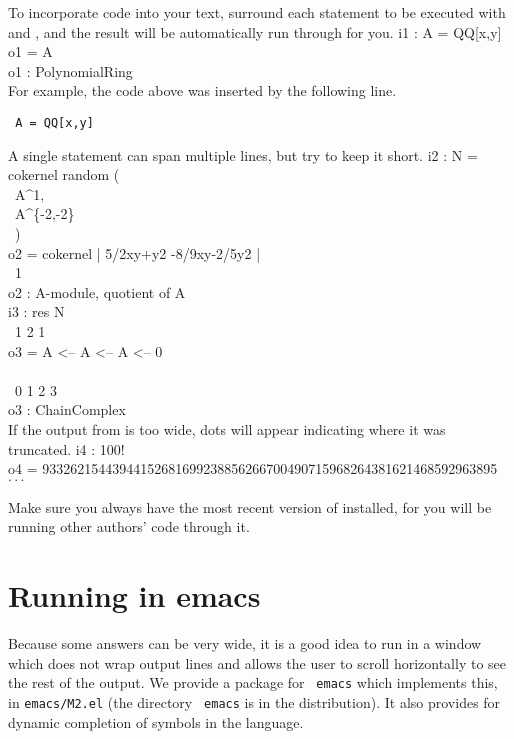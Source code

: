To incorporate \Mtwo code into your text, surround each statement to be
executed with \lll{} and \rrr, and the result will be automatically run
through \Mtwo for you.
\beginOutput
i1 : A = QQ[x,y]\\
\emptyLine
o1 = A\\
\emptyLine
o1 : PolynomialRing\\
\endOutput
For example, the code above was inserted by the following line.
\par\smallskip
\centerline{\tt
\lll A = QQ[x,y]\rrr
}
\smallskip\noindent
A single statement can span multiple lines, but try to keep it short.
\beginOutput
i2 : N = cokernel random (\\
\             A^1, \\
\             A^\{-2,-2\}\\
\             )\\
\emptyLine
o2 = cokernel | 5/2xy+y2 -8/9xy-2/5y2 |\\
\emptyLine
\                            1\\
o2 : A-module, quotient of A\\
\endOutput
\beginOutput
i3 : res N\\
\emptyLine
\      1      2      1\\
o3 = A  <-- A  <-- A  <-- 0\\
\                           \\
\     0      1      2      3\\
\emptyLine
o3 : ChainComplex\\
\endOutput
If the output from \Mtwo is too wide, dots will appear indicating
where it was truncated. 
\beginOutput
i4 : 100!\\
\emptyLine
o4 = 93326215443944152681699238856266700490715968264381621468592963895 $\cdot\cdot\cdot$\\
\endOutput

Make sure you always have the most recent version of \Mtwo installed, for
you will be running other authors' code through it.

\section{Running \Mtwo in emacs}

Because some answers can be very wide, it is a good idea to run \Mtwo in
a window which does not wrap output lines and allows the user to scroll
horizontally to see the rest of the output.  We provide a package for {\tt
{}emacs} which implements this, in {\tt {}emacs/M2.el} (the directory {\tt
emacs} is in the \Mtwo distribution).  It also provides for dynamic
completion of symbols in the language.

